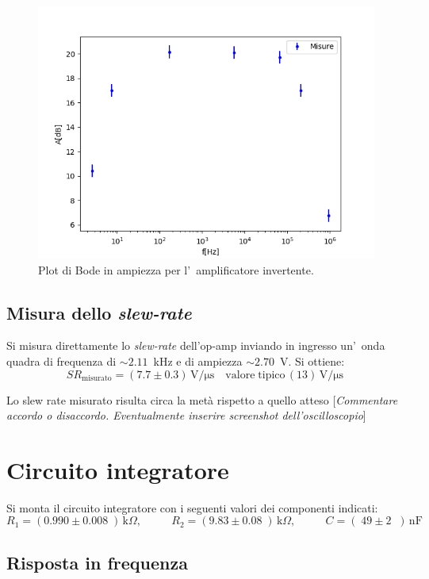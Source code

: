 \documentclass[10pt,a4paper]{article}
\newcommand{\rem}[1]{[\emph{#1}]}
\newcommand{\exn}{\phantom{xxx}}
\begin{document}
\begin{figure}[h]
\begin{center}
\includegraphics[width=0.7\linewidth]{2a.png}
\caption{\small Plot di Bode in ampiezza per l'~amplificatore invertente.}
\label{fig:bodeinv}
\end{center}
\end{figure}
%
\subsection{Misura dello \emph{slew-rate}}
Si misura direttamente lo \emph{slew-rate} dell'op-amp inviando in ingresso un'~onda quadra 
di frequenza di $\sim 2.11$~kHz e di ampiezza $\sim 2.70$~V. Si ottiene:
\[
SR_\mathrm{misurato} = (7.7 \pm 0.3 )\,\mathrm{V/\mu s} \quad \mathrm{valore \; tipico}\, (13 )\,\mathrm{V/\mu s}\
\]

Lo slew rate misurato risulta circa la metà rispetto a quello atteso
\rem{Commentare accordo o disaccordo. Eventualmente inserire screenshot dell'oscilloscopio}
%
\section{Circuito integratore}
Si monta il circuito integratore con i seguenti valori  dei componenti indicati: 
\[
R_1 = (0.990 \pm  0.008\;) \,\mathrm{k}\Omega, \:\:\;\:\exn 
R_2 = (9.83 \pm 0.08 \;) \,\mathrm{k}\Omega, \:\:\;\:\exn 
C = (\;49 \pm 2 \;\;)\,\mathrm{nF}
\]

\subsection{Risposta in frequenza}
\end{document}
